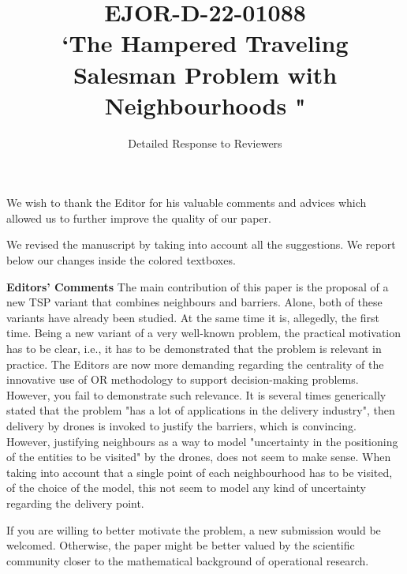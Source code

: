 \documentclass{article}
\title{EJOR-D-22-01088
	\\
	`The Hampered Traveling Salesman Problem with Neighbourhoods "}
\author{Detailed Response to Reviewers}
\begin{document}
	\maketitle
	
	We wish to thank the Editor for his valuable comments and advices which allowed us to further improve the quality of our paper.
	
	We revised the manuscript by taking into account all the suggestions. We report below our changes inside the colored textboxes.
	
	
	
	\begin{tcolorbox}[breakable,enhanced,coltitle=black,colback=yellow!75!white,colframe=yellow!75!white,borderline={1pt}{0pt}{black},boxrule=0pt]
		\textbf{Editors' Comments}
		The main contribution of this paper is the proposal of a new TSP variant that combines neighbours and barriers. Alone, both of these variants have already been studied. At the same time it is, allegedly, the first time. Being a new variant of a very well-known problem, the practical motivation has to be clear, i.e., it has to be demonstrated that the problem is relevant in practice.  The Editors are now more demanding regarding the centrality of the innovative use of OR methodology to support decision-making problems.  However, you fail to demonstrate such relevance. It is several times generically stated that the problem "has a lot of applications in the delivery industry", then delivery by drones is invoked to justify the barriers, which is convincing. However, justifying neighbours as a way to model "uncertainty in the positioning of the entities to be visited" by the drones, does not seem to make sense. When taking into account that a single point of each neighbourhood has to be visited, of the choice of the model, this not seem to model any kind of uncertainty regarding the delivery point.
		
		If you are willing to better motivate the problem, a new submission would be welcomed. Otherwise, the paper might be better valued by the scientific community closer to the mathematical background of operational research.
		
	\end{tcolorbox}
	
\end{document}
